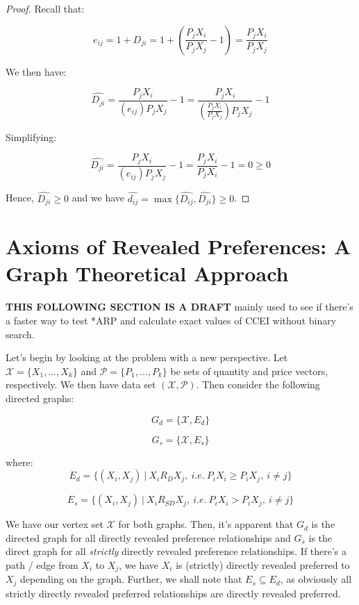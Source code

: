 \documentclass{article} %
\begin{document}
\begin{proof}
Recall that:

$$e_{ij}=1+D_{ji}=1+ \left (\frac{P_jX_i}{P_jX_j}-1 \right )=\frac{P_jX_i}{P_jX_j}$$

We then have:

$$\hat{D_{ji}}=\frac{P_jX_i}{(e_{ij})P_jX_j}-1=\frac{P_jX_i}{(\frac{P_jX_i}{P_jX_j})P_jX_j}-1$$

Simplifying:

$$\hat{D_{ji}}=\frac{P_jX_i}{(e_{ij})P_jX_j}-1=\frac{P_jX_i}{P_jX_i}-1=0\geq0$$

Hence, $\hat{D_{ji}}\geq0$ and we have $\hat{d_{ij}}=\max\{\hat{D_{ij}},\hat{D_{ji}}\}\geq0$.

\end{proof}

\newpage

\section{Axioms of Revealed Preferences: A Graph Theoretical Approach}

\textbf{THIS FOLLOWING SECTION IS A DRAFT} mainly used to see if there's a faster way to test *ARP and calculate exact values of CCEI without binary search.


Let's begin by looking at the problem with a new perspective. Let $\mathcal{X}=\{X_1,\ldots,X_k\}$ and $\mathcal{P}=\{P_1,\ldots,P_k\}$ be sets of quantity and price vectors, respectively. We then have data set $(\mathcal{X},\mathcal{P})$. Then consider the following directed graphs:


\begin{minipage}{.5\linewidth}
$$G_d=\{\mathcal{X},E_d\}$$
\end{minipage}%
\begin{minipage}{.5\linewidth}
$$G_s=\{\mathcal{X},E_s\}$$
\end{minipage}


where:
$$E_d=\{(X_i,X_j)\ |\ X_i R_D X_j,\ i.e.\ P_iX_i\geq P_iX_j,\ i\not=j\}$$

$$E_s=\{(X_i,X_j)\ |\ X_i R_{SD} X_j,\ i.e.\ P_iX_i> P_iX_j,\ i\not=j\}$$

We have our vertex set $\mathcal{X}$ for both graphs. Then, it's apparent that $G_d$ is the directed graph for all directly revealed preference relationships and $G_s$ is the direct graph for all \textit{strictly} directly revealed preference relationships. If there's a path / edge from $X_i$ to $X_j$, we have $X_i$ is (strictly) directly revealed preferred to $X_j$ depending on the graph. Further, we shall note that $E_s\subseteq E_d$, as obviously all strictly directly revealed preferred relationships are directly revealed preferred.
\end{document}
